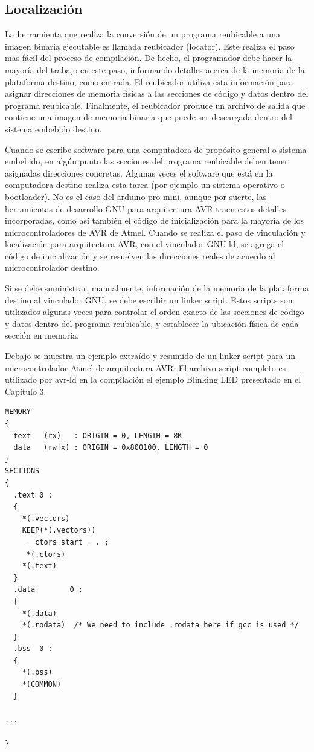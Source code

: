 \documentclass[output=paper, 
colorlinks,
citecolor=brown,
newtxmath
]{langscibook}
\begin{document}
\subsection {Localización}

La herramienta que realiza la conversión de un programa reubicable a
una imagen binaria ejecutable es llamada reubicador (locator).
Este realiza el paso mas fácil del proceso de compilación. De hecho, 
el programador debe hacer la mayoría del trabajo en este paso, informando
detalles acerca de la memoria de la plataforma destino, como entrada.
El reubicador utiliza esta información para asignar direcciones
de memoria físicas a las secciones de código y datos dentro del programa
reubicable. Finalmente, el reubicador produce un archivo de salida que contiene
una imagen de memoria binaria que puede ser descargada dentro del sistema
embebido destino.

Cuando se escribe software para una computadora de propósito general o
sistema embebido, en algún punto las secciones del programa reubicable
deben tener asignadas direcciones concretas. Algunas veces el software
que está en la computadora destino realiza esta tarea (por ejemplo un sistema
operativo o bootloader). No es el caso del arduino pro mini, aunque por suerte,
las herramientas de desarrollo GNU para arquitectura AVR traen estos detalles 
incorporadas, como así también el código de inicialización para la mayoría
de los microcontroladores de AVR de Atmel.
Cuando se realiza el paso de vinculación y localización para arquitectura AVR,
con el vinculador GNU ld, se agrega el código de inicialización y se 
resuelven las direcciones reales de acuerdo al microcontrolador destino.

Si se debe suministrar, manualmente, información de la memoria de la plataforma destino
al vinculador  GNU, se debe escribir un linker script.
Estos scripts son utilizados algunas veces para controlar el orden exacto de
las secciones de código y datos dentro del programa reubicable, y establecer
la ubicación física de cada sección en memoria.


Debajo se muestra un ejemplo extraído y resumido de un linker script
para un microcontrolador Atmel de arquitectura AVR. El archivo script
completo es utilizado por avr-ld en la compilación el ejemplo Blinking LED
presentado en el Capítulo 3.

\begin{verbatim}
MEMORY
{
  text   (rx)   : ORIGIN = 0, LENGTH = 8K
  data   (rw!x) : ORIGIN = 0x800100, LENGTH = 0
}
SECTIONS
{
  .text 0 :
  {
    *(.vectors)
    KEEP(*(.vectors))
     __ctors_start = . ;
     *(.ctors)
    *(.text)
  }
  .data        0 :
  {
    *(.data)
    *(.rodata)  /* We need to include .rodata here if gcc is used */
  }
  .bss  0 :
  {
    *(.bss)
    *(COMMON)
  }

...

}
\end{verbatim}
\end{document}
